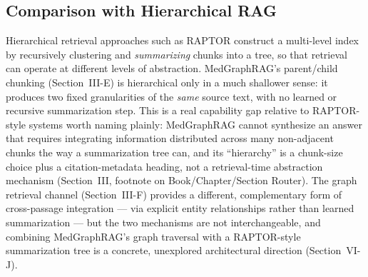 \documentclass[conference]{IEEEtran}
\begin{document}
\subsection{Comparison with Hierarchical RAG}
Hierarchical retrieval approaches such as RAPTOR \cite{sarthi2024raptor} construct a multi-level index by recursively clustering and \emph{summarizing} chunks into a tree, so that retrieval can operate at different levels of abstraction. MedGraphRAG's parent/child chunking (Section~III-E) is hierarchical only in a much shallower sense: it produces two fixed granularities of the \emph{same} source text, with no learned or recursive summarization step. This is a real capability gap relative to RAPTOR-style systems worth naming plainly: MedGraphRAG cannot synthesize an answer that requires integrating information distributed across many non-adjacent chunks the way a summarization tree can, and its ``hierarchy'' is a chunk-size choice plus a citation-metadata heading, not a retrieval-time abstraction mechanism (Section~III, footnote on Book/Chapter/Section Router). The graph retrieval channel (Section~III-F) provides a different, complementary form of cross-passage integration --- via explicit entity relationships rather than learned summarization --- but the two mechanisms are not interchangeable, and combining MedGraphRAG's graph traversal with a RAPTOR-style summarization tree is a concrete, unexplored architectural direction (Section~VI-J).
\end{document}
